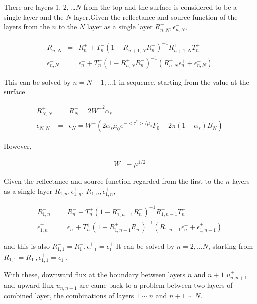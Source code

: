There are layers 1, 2, \ldots{}\(N\) from the top and the surface is considered to 
be a single layer and the \(N\) layer.Given the reflectance and source function of 
the layers from the \(n\) to the \(N\) layer as a single layer \(R^+_{n,N}, 
\epsilon^-_{n,N}\),

\begin{eqnarray}
  R^+_{n,N} & = & R^+_n 
      + T^-_n ( 1- R^+_{n+1,N} R^-_n )^{-1} R^+_{n+1,N} T^+_n \\
  \epsilon^-_{n,N} & = & \epsilon^-_n
    + T^-_n ( 1- R^+_{n,N} R^-_n )^{-1} 
      ( R^+_{n,N} \epsilon^+_n + \epsilon^-_{n,N} ) 
\end{eqnarray}

This can be solved by \(n=N-1, \ldots 1\) in sequence, starting from the value 
at the surface

\begin{eqnarray}
  R^+_{N,N} & = &  R^+_N = 2 {W^+}^2 \alpha_s \\
  \epsilon^-_{N,N} & = &  \epsilon^-_N 
    = W^+ \left( 2 \alpha_s \mu_0 e^{-<\tau^*>/\mu_0} F_0 
                 + 2 \pi (1-\alpha_s) B_N 
          \right)
\end{eqnarray}

However,

\begin{eqnarray}
  W^+ \equiv \mu^{1/2}
\end{eqnarray}

Given the reflectance and source function regarded from the first to the 
\(n\) layers as a single layer \(R^-_{1,n}, \epsilon^+_{1,n}\), \(R^-_{1,n}, 
\epsilon^+_{1,n}\),

\begin{eqnarray}
  R^-_{1,n} & = & R^-_n 
      + T^+_n ( 1- R^+_{1,n-1} R^-_n )^{-1} R^-_{1,n-1} T^-_n \\
  \epsilon^+_{1,n} & = & \epsilon^+_n
    + T^+_n ( 1- R^+_{1,n-1} R^-_n )^{-1} 
      ( R^-_{1,n-1} \epsilon^-_n + \epsilon^+_{1,n-1} ) 
\end{eqnarray}

and this is also \(R^-_{1,1} = R^-_1, \epsilon^+_{1,1} = \epsilon^+_1\)
It can be solved by \(n=2, \ldots N\), starting from \(R^-_{1,1} = R^-_1, 
\epsilon^+_{1,1} = \epsilon^+_1\).

With these, downward flux at the boundary between layers \(n\) and
\(n+1\) \(u^+_{n,n+1}\) and upward flux \(u^-_{n,n+1}\) are came back to a problem between
two layers of combined layer, the combinations of layers \(1\sim n\) and \(n+1\sim N\).  
 

